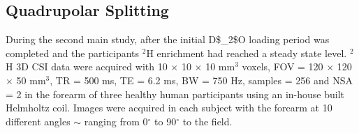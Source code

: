 

\subsection{Quadrupolar Splitting}

During the second main study, after the initial \ac{D$_2$O} loading period was completed and the participants $^2$H enrichment had reached a steady state level. $^2$H 3D \ac{CSI} data were acquired with 10 $\times$ 10 $\times$ 10 mm$^3$ voxels, \ac{FOV} = 120 $\times$ 120 $\times$ 50 mm$^3$, \ac{TR} = 500 ms, \ac{TE} = 6.2 ms, \ac{BW} = 750 Hz, samples = 256 and NSA = 2 in the forearm of three healthy human participants using an in-house built Helmholtz coil. Images were acquired in each subject with the forearm at 10 different angles $\sim$ ranging from 0$^\circ$ to 90$^\circ$ to the field. 

